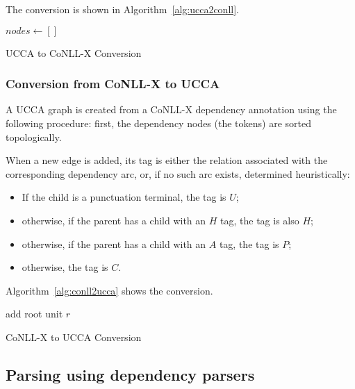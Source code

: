 \documentclass[11pt]{article}
\begin{document}
The conversion is shown in Algorithm~\ref{alg:ucca2conll}.

\begin{algorithm}
 $nodes \leftarrow []$\;
 \caption{UCCA to CoNLL-X Conversion}
 \label{alg:ucca2conll}
\end{algorithm}

\subsubsection{Conversion from CoNLL-X to UCCA}

A UCCA graph is created from a CoNLL-X dependency annotation using the following procedure: first, the dependency nodes (the tokens) are sorted topologically.

When a new edge is added, its tag is either the relation associated with the corresponding dependency arc, or, if no such arc exists, determined heuristically:
\begin{itemize}
\item If the child is a punctuation terminal, the tag is $U$;
\item otherwise, if the parent has a child with an $H$ tag, the tag is also $H$;
\item otherwise, if the parent has a child with an $A$ tag, the tag is $P$;
\item otherwise, the tag is $C$.
\end{itemize}

Algorithm~\ref{alg:conll2ucca} shows the conversion.

\begin{algorithm}
 add root unit $r$\;
 \caption{CoNLL-X to UCCA Conversion}
 \label{alg:conll2ucca}
\end{algorithm}

\subsection{Parsing using dependency parsers}
\end{document}
